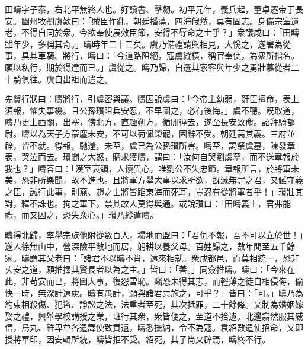 
\begin{pinyinscope}
田疇字子泰，右北平無終人也。好讀書、擊劒。初平元年，義兵起，董卓遷帝于長安。幽州牧劉虞歎曰：「賊臣作亂，朝廷播蕩，四海俄然，莫有固志。身備宗室遺老，不得自同於衆。今欲奉使展效臣節，安得不辱命之士乎？」衆議咸曰：「田疇雖年少，多稱其奇。」疇時年二十二矣。虞乃備禮請與相見，大恱之，遂署為從事，具其車騎。將行，疇曰：「今道路阻絕，寇虜縱橫，稱官奉使，為衆所指名。願以私行，期於得達而已。」虞從之。疇乃歸，自選其家客與年少之勇壯慕從者二十騎俱往。虞自出祖而遣之。

先賢行狀曰：疇將行，引虞密與議。疇因說虞曰：「今帝主幼弱，姧臣擅命，表上須報，懼失事機。且公孫瓚阻兵安忍，不早圖之，必有後悔。」虞不聽。旣取道，疇乃更上西關，出塞，傍北方，直趣朔方，循閒徑去，遂至長安致命。詔拜騎都尉。疇以為天子方蒙塵未安，不可以荷佩榮寵，固辭不受。朝廷高其義。三府並辟，皆不就。得報，馳還，未至，虞已為公孫瓚所害。疇至，謁祭虞墓，陳發章表，哭泣而去。瓚聞之大怒，購求獲疇，謂曰：「汝何自哭劉虞墓，而不送章報於我也？」疇荅曰：「漢室衰穨，人懷異心，唯劉公不失忠節。章報所言，於將軍未美，恐非所樂聞，故不進也。且將軍方舉大事以求所欲，旣滅無罪之君，又讎守義之臣，誠行此事，則燕、趙之士將皆蹈東海而死耳，豈忍有從將軍者乎！」瓚壯其對，釋不誅也。拘之軍下，禁其故人莫得與通。或說瓚曰：「田疇義士，君弗能禮，而又囚之，恐失衆心。」瓚乃縱遣疇。

疇得北歸，率舉宗族他附從數百人，埽地而盟曰：「君仇不報，吾不可以立於世！」遂人徐無山中，營深險平敞地而居，躬耕以養父母。百姓歸之，數年閒至五千餘家。疇謂其父老曰：「諸君不以疇不肖，遠來相就。衆成都邑，而莫相統一，恐非乆安之道，願推擇其賢長者以為之主。」皆曰：「善。」同僉推疇。疇曰：「今來在此，非苟安而已，將圖大事，復怨雪恥。竊恐未得其志，而輕薄之徒自相侵侮，偷快一時，無深計遠慮。疇有愚計，願與諸君共施之，可乎？」皆曰：「可。」疇乃為約束相殺傷、犯盜、諍訟之法，法重者至死，其次抵罪，二十餘條。又制為婚姻嫁娶之禮，興舉學校講授之業，班行其衆，衆皆便之，至道不拾遺。北邊翕然服其威信，烏丸、鮮卑並各遣譯使致貢遺，疇悉撫納，令不為寇。袁紹數遣使招命，又即授將軍印，因安輯所統，疇皆拒不受。紹死，其子尚又辟焉，疇終不行。


\end{pinyinscope}
